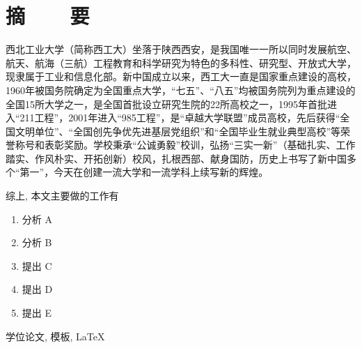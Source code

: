 \renewcommand{\baselinestretch}{1.5}
\fontsize{12pt}{13pt}\selectfont

\chapter[摘要]{摘~~~~要}

西北工业大学（简称西工大）坐落于陕西西安，是我国唯一一所以同时发展航空、航天、航海（三航）工程教育和科学研究为特色的多科性、研究型、开放式大学，现隶属于工业和信息化部。新中国成立以来，西工大一直是国家重点建设的高校，1960年被国务院确定为全国重点大学，“七五”、“八五”均被国务院列为重点建设的全国15所大学之一，是全国首批设立研究生院的22所高校之一，1995年首批进入“211工程”，2001年进入“985工程”，是“卓越大学联盟”成员高校，先后获得“全国文明单位”、“全国创先争优先进基层党组织”和“全国毕业生就业典型高校”等荣誉称号和表彰奖励。学校秉承“公诚勇毅”校训，弘扬“三实一新”（基础扎实、工作踏实、作风朴实、开拓创新）校风，扎根西部、献身国防，历史上书写了新中国多个“第一”，今天在创建一流大学和一流学科上续写新的辉煌。

综上, 本文主要做的工作有
\vspace{-10pt}
\begin{enumerate}
    \item 分析 A
    \item 分析 B
    \item 提出 C
    \item 提出 D
    \item 提出 E
\end{enumerate}
\vspace{-10pt}

\vspace{1em}
 \quad 学位论文, 模板, \LaTeX

\clearpage
\endinput
